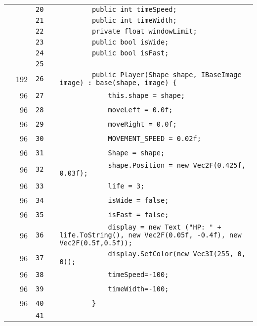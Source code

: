 \documentclass[a4paper,landscape,10pt]{article}
\begin{document}
\begin{longtable}[l]{lrrll}
\cellcolor{gray} &  & \verb~20~ & & \verb~        public int timeSpeed;~\\
\cellcolor{gray} &  & \verb~21~ & & \verb~        public int timeWidth;~\\
\cellcolor{gray} &  & \verb~22~ & & \verb~        private float windowLimit;~\\
\cellcolor{gray} &  & \verb~23~ & & \verb~        public bool isWide;~\\
\cellcolor{gray} &  & \verb~24~ & & \verb~        public bool isFast;~\\
\cellcolor{gray} &  & \verb~25~ & & \verb~~\\
\cellcolor{green} & 192 & \verb~26~ & & \verb~        public Player(Shape shape, IBaseImage image) : base(shape, image) {~\\
\cellcolor{green} & 96 & \verb~27~ & & \verb~            this.shape = shape;~\\
\cellcolor{green} & 96 & \verb~28~ & & \verb~            moveLeft = 0.0f;~\\
\cellcolor{green} & 96 & \verb~29~ & & \verb~            moveRight = 0.0f;~\\
\cellcolor{green} & 96 & \verb~30~ & & \verb~            MOVEMENT_SPEED = 0.02f;~\\
\cellcolor{green} & 96 & \verb~31~ & & \verb~            Shape = shape;~\\
\cellcolor{green} & 96 & \verb~32~ & & \verb~            shape.Position = new Vec2F(0.425f, 0.03f);~\\
\cellcolor{green} & 96 & \verb~33~ & & \verb~            life = 3;~\\
\cellcolor{green} & 96 & \verb~34~ & & \verb~            isWide = false;~\\
\cellcolor{green} & 96 & \verb~35~ & & \verb~            isFast = false;~\\
\cellcolor{green} & 96 & \verb~36~ & & \verb~            display = new Text ("HP: " + life.ToString(), new Vec2F(0.05f, -0.4f), new Vec2F(0.5f,0.5f));~\\
\cellcolor{green} & 96 & \verb~37~ & & \verb~            display.SetColor(new Vec3I(255, 0, 0));~\\
\cellcolor{green} & 96 & \verb~38~ & & \verb~            timeSpeed=-100;~\\
\cellcolor{green} & 96 & \verb~39~ & & \verb~            timeWidth=-100;~\\
\cellcolor{green} & 96 & \verb~40~ & & \verb~        }~\\
\cellcolor{gray} &  & \verb~41~ & & \verb~~\\

\end{longtable}
\end{document}
